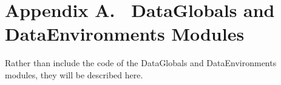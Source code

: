 \chapter{Appendix A.~ DataGlobals and DataEnvironments Modules}\label{appendix-a.-dataglobals-and-dataenvironments-modules}

Rather than include the code of the DataGlobals and DataEnvironments modules, they will be described here.
